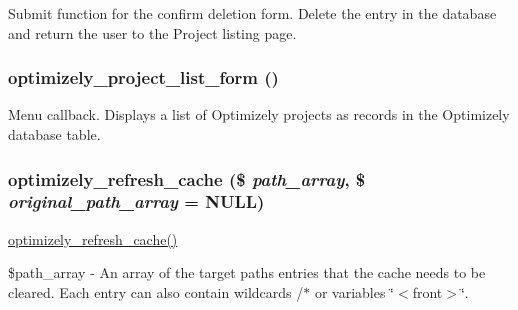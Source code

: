 Submit function for the confirm deletion form. Delete the entry in the database and return the user to the Project listing page. \hypertarget{optimizely_8admin_8inc_aa9928175901069d6541dfaea2b907aec}{
\subsubsection[{optimizely\_\-project\_\-list\_\-form}]{\setlength{\rightskip}{0pt plus 5cm}optimizely\_\-project\_\-list\_\-form ()}}
\label{optimizely_8admin_8inc_aa9928175901069d6541dfaea2b907aec}
Menu callback. Displays a list of Optimizely projects as records in the Optimizely database table. \hypertarget{optimizely_8admin_8inc_a7b0f4a56fbd620d68ed8e62661ad47d2}{
\subsubsection[{optimizely\_\-refresh\_\-cache}]{\setlength{\rightskip}{0pt plus 5cm}optimizely\_\-refresh\_\-cache (\$ {\em path\_\-array}, \/  \$ {\em original\_\-path\_\-array} = {\ttfamily NULL})}}
\label{optimizely_8admin_8inc_a7b0f4a56fbd620d68ed8e62661ad47d2}
\hyperlink{optimizely_8admin_8inc_a7b0f4a56fbd620d68ed8e62661ad47d2}{optimizely\_\-refresh\_\-cache()}

\$path\_\-array -\/ An array of the target paths entries that the cache needs to be cleared. Each entry can also contain wildcards /$\ast$ or variables \char`\"{}$<$front$>$\char`\"{}. 